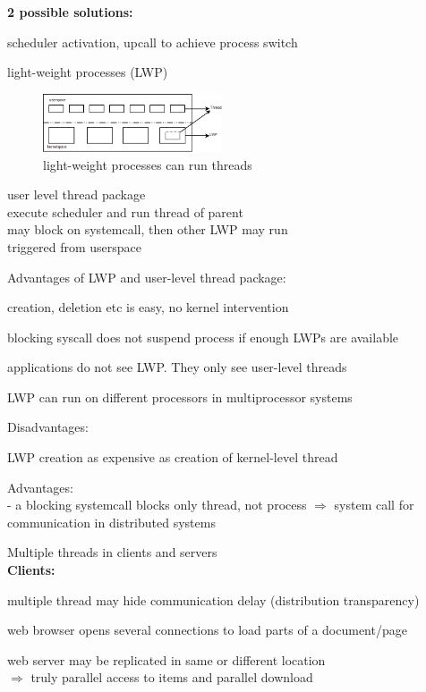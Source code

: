 \textbf{2 possible solutions:}\\
\begin{compactenum}
\item scheduler activation, upcall to achieve process switch
\item light-weight processes (LWP)\\
\begin{figure}[h]
	\centering
	\includegraphics[width=200px]{gfx/thread_lwp.png}
	\caption{light-weight processes can run threads}
	\label{img:lwp_threads}
\end{figure}
user level thread package\\
execute scheduler and run thread of parent\\
may block on systemcall, then other LWP may run\\
triggered from userspace\\
\end{compactenum}
Advantages of LWP and user-level thread package:\\
\begin{compactenum}
\item creation, deletion etc is easy, no kernel intervention
\item blocking syscall does not suspend process if enough LWPs are available
\item applications do not see LWP. They only see user-level threads
\item LWP can run on different processors in multiprocessor systems
\end{compactenum}

Disadvantages:\\
\begin{compactenum}
\item LWP creation as expensive as creation of kernel-level thread
\end{compactenum}

Advantages:\\
- a blocking systemcall blocks only thread, not process
$\Rightarrow$ system call for communication in distributed systems

Multiple threads in clients and servers\\

\textbf{Clients:}\\
\begin{compactitem}
\item multiple thread may hide communication delay (distribution transparency)
\item web browser opens several connections to load parts of a document/page
\item web server may be replicated in same or different location\\
$\Rightarrow$ truly parallel access to items and parallel download
\end{compactitem}

